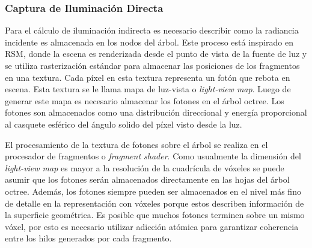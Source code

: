 \subsubsection{Captura de Iluminación Directa}
\label{subsub:voxel_capture}
Para el cálculo de iluminación indirecta es necesario describir como la radiancia incidente es almacenada en los nodos del árbol. Este proceso está inspirado en \ac{RSM}, donde la escena es renderizada desde el punto de vista de la fuente de luz y se utiliza rasterización estándar para almacenar las posiciones de los fragmentos en una textura. Cada píxel en esta textura representa un fotón que rebota en escena. Esta textura se le llama mapa de luz-vista o \emph{light-view map}. Luego de generar este mapa es necesario almacenar los fotones en el árbol octree. Los fotones son almacenados como una distribución direccional y energía proporcional al casquete esférico del ángulo solido del píxel visto desde la luz.

El procesamiento de la textura de fotones sobre el árbol se realiza en el procesador de fragmentos o \emph{fragment shader}. Como usualmente la dimensión del \emph{light-view map} es mayor a la resolución de la cuadrícula de vóxeles se puede asumir que los fotones serán almacenados directamente en las hojas del árbol octree. Además, los fotones siempre pueden ser almacenados en el nivel más fino de detalle en la representación con vóxeles porque estos describen información de la superficie geométrica. Es posible que muchos fotones terminen sobre un mismo vóxel, por esto es necesario utilizar adicción atómica para garantizar coherencia entre los hilos generados por cada fragmento.
